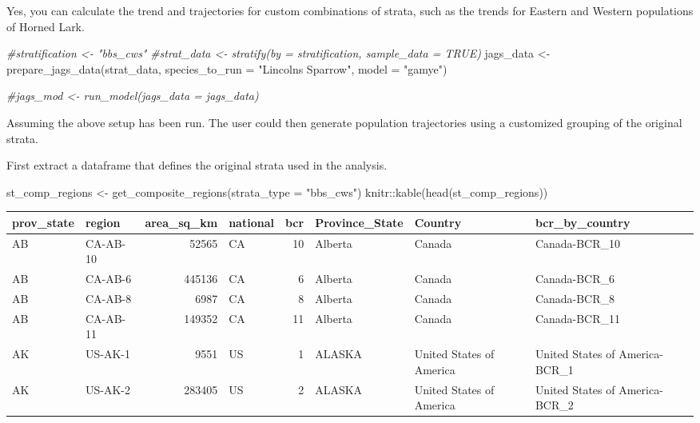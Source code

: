 \documentclass[
]{book}
\newenvironment{Shaded}{\begin{snugshade}}{\end{snugshade}}
\newcommand{\AttributeTok}[1]{\textcolor[rgb]{0.77,0.63,0.00}{#1}}
\newcommand{\CommentTok}[1]{\textcolor[rgb]{0.56,0.35,0.01}{\textit{#1}}}
\newcommand{\FunctionTok}[1]{\textcolor[rgb]{0.00,0.00,0.00}{#1}}
\newcommand{\NormalTok}[1]{#1}
\newcommand{\OtherTok}[1]{\textcolor[rgb]{0.56,0.35,0.01}{#1}}
\newcommand{\SpecialCharTok}[1]{\textcolor[rgb]{0.00,0.00,0.00}{#1}}
\newcommand{\StringTok}[1]{\textcolor[rgb]{0.31,0.60,0.02}{#1}}
\begin{document}
Yes, you can calculate the trend and trajectories for custom combinations of strata, such as the trends for Eastern and Western populations of Horned Lark.

\begin{Shaded}
\begin{Highlighting}[]
    \CommentTok{\#stratification \textless{}{-} "bbs\_cws"}
    \CommentTok{\#strat\_data \textless{}{-} stratify(by = stratification, sample\_data = TRUE)}
\NormalTok{    jags\_data }\OtherTok{\textless{}{-}} \FunctionTok{prepare\_jags\_data}\NormalTok{(strat\_data,}
                              \AttributeTok{species\_to\_run =} \StringTok{"Lincoln\textquotesingle{}s Sparrow"}\NormalTok{,}
                              \AttributeTok{model =} \StringTok{"gamye"}\NormalTok{)}

    \CommentTok{\#jags\_mod \textless{}{-} run\_model(jags\_data = jags\_data)}
\end{Highlighting}
\end{Shaded}

Assuming the above setup has been run. The user could then generate population trajectories using a customized grouping of the original strata.

First extract a dataframe that defines the original strata used in the analysis.

\begin{Shaded}
\begin{Highlighting}[]
\NormalTok{st\_comp\_regions }\OtherTok{\textless{}{-}} \FunctionTok{get\_composite\_regions}\NormalTok{(}\AttributeTok{strata\_type =} \StringTok{"bbs\_cws"}\NormalTok{)}
\NormalTok{knitr}\SpecialCharTok{::}\FunctionTok{kable}\NormalTok{(}\FunctionTok{head}\NormalTok{(st\_comp\_regions))}
\end{Highlighting}
\end{Shaded}

\begin{tabular}{l|l|r|l|r|l|l|l}
\hline
prov\_state & region & area\_sq\_km & national & bcr & Province\_State & Country & bcr\_by\_country\\
\hline
AB & CA-AB-10 & 52565 & CA & 10 & Alberta & Canada & Canada-BCR\_10\\
\hline
AB & CA-AB-6 & 445136 & CA & 6 & Alberta & Canada & Canada-BCR\_6\\
\hline
AB & CA-AB-8 & 6987 & CA & 8 & Alberta & Canada & Canada-BCR\_8\\
\hline
AB & CA-AB-11 & 149352 & CA & 11 & Alberta & Canada & Canada-BCR\_11\\
\hline
AK & US-AK-1 & 9551 & US & 1 & ALASKA & United States of America & United States of America-BCR\_1\\
\hline
AK & US-AK-2 & 283405 & US & 2 & ALASKA & United States of America & United States of America-BCR\_2\\
\hline
\end{tabular}
\end{document}

